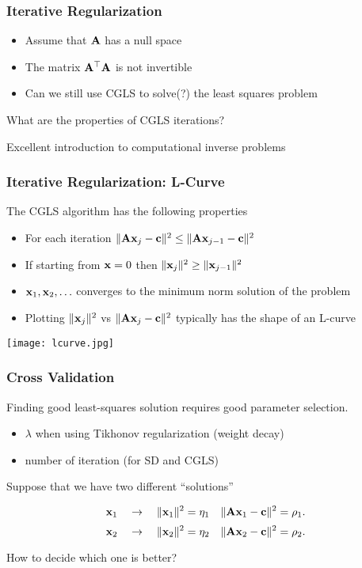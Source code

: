 \documentclass[12pt,fleqn]{beamer}
\begin{document}
\begin{frame}
	\frametitle{Iterative Regularization}

\begin{itemize}
\item
Assume that ${\bf A}$ has a null space
\item The matrix ${\bf A}^{\top}{\bf A}$ is not invertible
\item Can we still use CGLS to solve(?) the least squares problem
\end{itemize}

\bigskip

What are the properties of CGLS iterations?

\bigskip

Excellent introduction to computational inverse problems~\cite{Hansen1998,Vogel2002,Hansen2010}

\end{frame}




\begin{frame}
	\frametitle{Iterative Regularization: L-Curve}


The CGLS algorithm has the following properties
\begin{itemize}
\item For each iteration $\| {\bf A} {\bf x}_j -{\bf c} \|^2 \le \| {\bf A} {\bf x}_{j-1} -{\bf c} \|^2$
\item If starting from  ${\bf x}=0$ then $\|{\bf x}_j  \|^2 \ge \|  {\bf x}_{j-1}  \|^2$

\item ${\bf x}_1,{\bf x}_2,\ldots$ converges to the minimum norm solution of the problem
\item Plotting $\|{\bf x}_j\|^2$ vs $\| {\bf A}{\bf x}_j -{\bf c} \|^2$ typically has the shape of an L-curve
\end{itemize}



\begin{center}
\texttt{[image: lcurve.jpg]}
\end{center}

\end{frame}



\begin{frame}[fragile]
	\frametitle{Cross Validation}

Finding good least-squares solution requires good parameter selection.
\begin{itemize}
\item $\lambda$ when using Tikhonov regularization (weight decay)
\item number of iteration (for SD and CGLS)
\end{itemize}

\bigskip

Suppose that we have two different ``solutions''

$${\bf x}_1\quad  \rightarrow \quad  \|{\bf x}_1\|^2 = \eta_1 \quad \|{\bf A} {\bf x}_1 - {\bf c}\|^2 = \rho_1. $$
$${\bf x}_2\quad  \rightarrow \quad  \|{\bf x}_2\|^2 = \eta_2 \quad \|{\bf A} {\bf x}_2 - {\bf c}\|^2 = \rho_2. $$

How to decide which one is better?

\end{frame}
\end{document}
